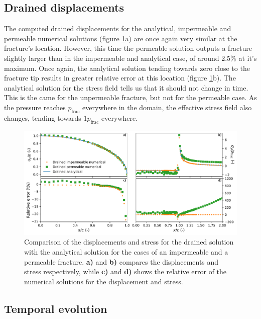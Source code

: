 \documentclass{article}
\begin{document}
\subsection{Drained displacements}

The computed drained displacements for the analytical, impermeable and permeable numerical solutions (figure \ref{fig:drained}a) are once again very similar at the fracture's location. However, this time the permeable solution outputs a fracture slightly larger than in the impermeable and analytical case, of around 2.5\% at it's maximum. Once again, the analytical solution tending towards zero close to the fracture tip results in greater relative error at this location (figure \ref{fig:drained}b). The analytical solution for the stress field tells us that it should not change in time. This is the came for the unpermeable fracture, but not for the permeable case. As the pressure reaches $p_{\text{frac}}$ everywhere in the domain, the effective stress field also changes, tending towards $1p_{\text{frac}}$ everywhere.

\begin{figure}[h]
    \centering
    \includegraphics[width=1\textwidth]{../figures/drained}
    \caption{Comparison of the displacements and stress for the drained solution with the analytical solution for the cases of an impermeable and a permeable fracture. \textbf{a)} and \textbf{b)} compares the displacements and stress respectively, while \textbf{c)} and \textbf{d)} shows the relative error of the numerical solutions for the displacement and stress.}
    \label{fig:drained}
\end{figure}
\FloatBarrier

\subsection{Temporal evolution}
\end{document}
